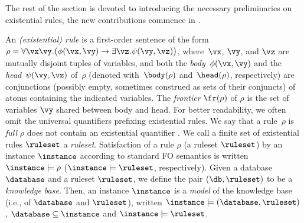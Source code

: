 \pagebreak

The rest of the section is devoted to introducing the necessary preliminaries on existential rules, the new contributions commence in .


\medskip {}
An \emph{(existential) rule} is a first-order sentence of the  
form~$\rho = \forall{\vx\vy}. \big( \phi(\vx, \vy)
\rightarrow \exists{\vz}.\psi(\vy, \vz) \big)$,
where~$\vx$, $\vy$, and $\vz$ are mutually disjoint tuples of variables, and both 
the \emph{body}~$\phi(\vx, \vy)$ and the \emph{head}~$\psi(\vy, \vz)$ of~$\rho$  (denoted with~$\body(\rho)$ and~$\head(\rho)$, respectively) are conjunctions (possibly empty, sometimes construed as sets of their conjuncts) of atoms containing %
the indicated variables.
The \emph{frontier} $\fr(\rho)$ of $\rho$ is the set of variables $\vy$ shared between body and head. For better readability, we often omit the universal quantifiers prefixing existential rules. 
%
We say that a rule~$\rho$ is 
\emph{full} \iffi $\rho$ does not contain an existential quantifier%
. We call a finite set of existential rules $\ruleset$ a {\em ruleset}. Satisfaction of a rule $\rho$  (a ruleset $\ruleset$) by an instance $\instance$ according to standard FO semantics is written $\instance \models \rho$ ($\instance \models \ruleset$, respectively). Given a database $\database$ and a ruleset $\ruleset$, we define the pair $(\db,\ruleset)$ to be a \emph{knowledge base}. Then, an instance $\instance$ is a \emph{model} of the knowledge base (i.e., of $\database$ and $\ruleset$), written $\instance\models (\database,\ruleset)$, \iffi $\database \subseteq \instance$ and $\instance \models \ruleset$. 

